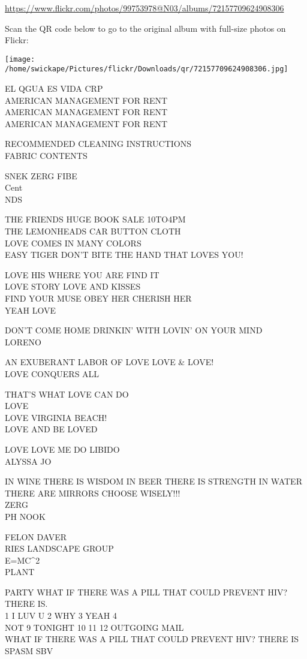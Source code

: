 \documentclass[10pt,letterpaper]{article}
\begin{document}
\url{https://www.flickr.com/photos/99753978@N03/albums/72157709624908306}

Scan the QR code below to go to the original album with full-size photos on Flickr:

\texttt{[image: /home/swickape/Pictures/flickr/Downloads/qr/72157709624908306.jpg]}


EL QGUA ES VIDA CRP\\
AMERICAN MANAGEMENT FOR RENT\\
AMERICAN MANAGEMENT FOR RENT\\
AMERICAN MANAGEMENT FOR RENT

RECOMMENDED CLEANING INSTRUCTIONS\\
FABRIC CONTENTS

SNEK ZERG FIBE\\
Cent\\
NDS

THE FRIENDS HUGE BOOK SALE 10TO4PM\\
THE LEMONHEADS CAR BUTTON CLOTH\\
LOVE COMES IN MANY COLORS\\
EASY TIGER DON'T BITE THE HAND THAT LOVES YOU!

LOVE HIS WHERE YOU ARE FIND IT\\
LOVE STORY LOVE AND KISSES\\
FIND YOUR MUSE OBEY HER CHERISH HER\\
YEAH LOVE

DON'T COME HOME DRINKIN' WITH LOVIN' ON YOUR MIND\\
LORENO

AN EXUBERANT LABOR OF LOVE LOVE \& LOVE!\\
LOVE CONQUERS ALL

THAT'S WHAT LOVE CAN DO\\
LOVE\\
LOVE VIRGINIA BEACH!\\
LOVE AND BE LOVED

LOVE LOVE ME DO LIBIDO\\
ALYSSA JO

IN WINE THERE IS WISDOM IN BEER THERE IS STRENGTH IN WATER THERE ARE MIRRORS CHOOSE WISELY!!!\\
ZERG\\
PH NOOK

FELON DAVER\\
RIES LANDSCAPE GROUP\\
E=MC\^{}2\\
PLANT

PARTY WHAT IF THERE WAS A PILL THAT COULD PREVENT HIV?  THERE IS.\\
1 I LUV U 2 WHY 3 YEAH 4\\
NOT 9 TONIGHT 10 11 12 OUTGOING MAIL\\
WHAT IF THERE WAS A PILL THAT COULD PREVENT HIV?  THERE IS SPASM SBV
\end{document}
